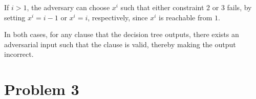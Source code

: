 \documentclass{article}
\begin{document}
If $i > 1$, the adversary can choose $x^i$ such that either constraint 2 or
3 fails, by setting $x^i = i - 1$ or $x^i = i$, respectively, since $x^i$ is
reachable from $1$.

In both cases, for any clause that the decision tree outputs, there exists an
adversarial input such that the clause is valid, thereby making the output
incorrect.

\section*{Problem 3}
\end{document}
